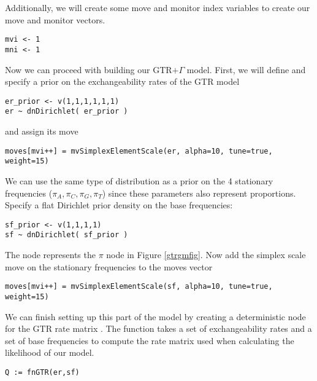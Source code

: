 Additionally, we will create some move and monitor index variables to create our move and monitor vectors.

{\tt \begin{snugshade*}
\begin{lstlisting}
mvi <- 1
mni <- 1
\end{lstlisting}
\end{snugshade*}}

Now we can proceed with building our GTR$+\Gamma$ model.
First, we will define and specify a prior on the exchangeability rates of the GTR model

{\tt \begin{snugshade*}
\begin{lstlisting}
er_prior <- v(1,1,1,1,1,1) 
er ~ dnDirichlet( er_prior )
\end{lstlisting}
\end{snugshade*}}

and assign its move

{\tt \begin{snugshade*}
\begin{lstlisting}
moves[mvi++] = mvSimplexElementScale(er, alpha=10, tune=true, weight=15) 
\end{lstlisting}
\end{snugshade*}}

We can use the same type of distribution as a prior on the 4 stationary frequencies ($\pi_A, \pi_C, \pi_G, \pi_T$) since these parameters also represent proportions. 
Specify a flat Dirichlet prior density on the base frequencies:
{\tt \begin{snugshade*}
\begin{lstlisting}
sf_prior <- v(1,1,1,1) 
sf ~ dnDirichlet( sf_prior )
\end{lstlisting}
\end{snugshade*}}

The node  represents the $\pi$ node in Figure \ref{gtrgmfig}.
Now add the simplex scale move on the stationary frequencies to the moves vector

{\tt \small \begin{snugshade*}
\begin{lstlisting}
moves[mvi++] = mvSimplexElementScale(sf, alpha=10, tune=true, weight=15) 
\end{lstlisting}
\end{snugshade*}}

We can finish setting up this part of the model by creating a deterministic node for the GTR rate matrix . 
The  function takes a set of exchangeability rates and a set of base frequencies to compute the rate matrix used when calculating the likelihood of our model.
{\tt \begin{snugshade*}
\begin{lstlisting}
Q := fnGTR(er,sf)
\end{lstlisting}
\end{snugshade*}}


